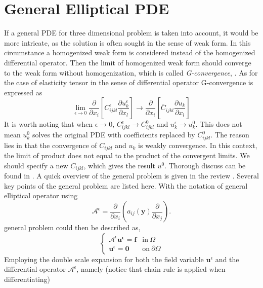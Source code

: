 \documentclass[10pt,a4paper]{scrreprt}
\begin{document}
\section{General Elliptical PDE}
\label{sec:pde}
If a general PDE for three dimensional problem is taken into account, it would be more intricate, as the solution is often sought in the sense of weak form. In this circumstance a homogenized weak form is considered instead of the homogenized differential operator. Then the limit of homogenized weak form should converge to the weak form without homogenization, which is called \textit{G-convergence}, \citep{hollister1992comparison}. As for the case of elasticity tensor in the sense of differential operator G-convergence is expressed as
\begin{equation}
\label{eq: G conv}
\lim_{\epsilon \to 0} \dfrac{\partial}{\partial x_{i}} \left[ C^{\epsilon}_{ijkl} \dfrac{\partial u^{\epsilon}_{k}}{\partial x_{l}} \right] \rightarrow \dfrac{\partial}{\partial x_{i}} \left[ \bar{C}_{ijkl} \dfrac{\partial u_{k}}{\partial x_{l}} \right]
\end{equation}
It is worth noting that when $\epsilon \to 0$, $C^{\epsilon}_{ijkl} \to C^{0}_{ijkl}$ and $u^{\epsilon}_{k} \to u^{0}_{k}$. This does not mean $u^{0}_{k}$ solves the original PDE with coefficients replaced by $C^{0}_{ijkl}$. The reason lies in that the convergence of $C_{ijkl}$ and $u_{k}$ is weakly convergence. In this context, the limit of product does not equal to the product of the convergent limits. We should specify a new $\bar{C}_{ijkl}$, which gives the result $u^{0}$. Thorough discuss can be found in \citep{cioranescu_introduction_2000}. A quick overview of the general problem is given in the review \citep{hassani1998review}. Several key points of the general problem are listed here. With the notation of general elliptical operator using 
\begin{equation}
\mathcal{A}^{\epsilon} = \dfrac{\partial}{\partial x_{i}} \left( a_{ij}(\mathbf{y}) \dfrac{\partial}{\partial x_{j}} \right).
\end{equation}
general problem could then be described as,
\begin{equation}
\left\{
\begin{array}{ll}
\mathcal{A}^{\epsilon} \mathbf{u^{\epsilon}}= \mathbf{f} & \text{in} \ \Omega \\
\mathbf{u}^{\epsilon} = \mathbf{0} & \text{on} \ \partial \Omega
\end{array}
\right.
\end{equation}
Employing the double scale expansion for both the field variable $\mathbf{u}^{\epsilon}$ and the differential operator $\mathcal{A}^{\epsilon}$, namely (notice that chain rule is applied when differentiating)
\end{document}
